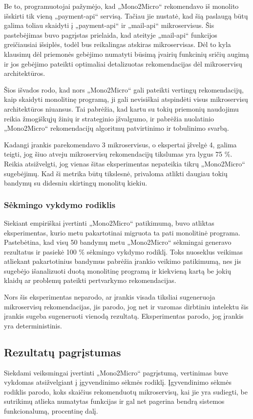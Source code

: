 \documentclass{VUMIFPSbakalaurinis}
\begin{document}
Be to, programuotojai pažymėjo, kad „Mono2Micro“ rekomendavo iš monolito išskirti tik vieną „payment-api“ servisą. Tačiau jie nustatė, kad šią paslaugą būtų galima toliau skaidyti į „payment-api“ ir „mail-api“ mikroservisus. Šis pastebėjimas buvo pagrįstas prielaida, kad ateityje „mail-api“ funkcijos greičiausiai išsiplės, todėl bus reikalingas atskiras mikroservisas. Dėl to kyla klausimų dėl priemonės gebėjimo numatyti būsimą įvairių funkcinių sričių augimą ir jos gebėjimo pateikti optimaliai detalizuotas rekomendacijas dėl mikroservisų architektūros.

Šios išvados rodo, kad nors „Mono2Micro“ gali pateikti vertingų rekomendacijų, kaip skaidyti monolitinę programą, ji gali nevisiškai atspindėti visus mikroservisų architektūros niuansus. Tai pabrėžia, kad kartu su tokių priemonių naudojimu reikia žmogiškųjų žinių ir strateginio įžvalgumo, ir pabrėžia nuolatinio „Mono2Micro“ rekomendacijų algoritmų patvirtinimo ir tobulinimo svarbą.

Kadangi įrankis parekomendavo 3 mikroservisus, o ekspertai įžvelgė 4, galima teigti, jog šiuo atveju mikroservisų rekomendacijų tikslumas yra lygus 75 \%. Reikia atsižvelgti, jog vienas šitas eksperimentas nepateikia tikrų „Mono2Micro“ sugebėjimų. Kad ši metrika būtų tikslesnė, privaloma atlikti daugiau tokių bandymų su didesniu skirtingų monolitų kiekiu.

\subsubsection{Sėkmingo vykdymo rodiklis}
Siekiant empiriškai įvertinti „Mono2Micro“ patikimumą, buvo atliktas eksperimentas, kurio metu pakartotinai migruota ta pati monolitinė programa. Pastebėtina, kad visų 50 bandymų metu „Mono2Micro“ sėkmingai generavo rezultatus ir pasiekė 100 \% sėkmingo vykdymo rodiklį. Toks nuoseklus veikimas atliekant pakartotinius bandymus pabrėžia įrankio veikimo patikimumą, nes jis sugebėjo išanalizuoti duotą monolitinę programą ir kiekvieną kartą be jokių klaidų ar problemų pateikti pertvarkymo rekomendacijas.

Nors šis eksperimentas neparodo, ar įrankis visada tiksliai sugeneruoja mikroservisų rekomendacijas, jis parodo, jog net ir varomas dirbtiniu intelektu šis įrankis sugeba sugeneruoti vienodą rezultatą. Eksperimentas parodo, jog įrankis yra deterministinis.

\subsection{Rezultatų pagrįstumas}
Siekdami veiksmingai įvertinti „Mono2Micro“ pagrįstumą, vertinimas buve vykdomas atsižvelgiant į įgyvendinimo sėkmės rodiklį. Įgyvendinimo sėkmės rodiklis parodo, koks skaičius rekomenduotų mikroservisų, kai jie yra sudiegti, be sutrikimų atlieka numatytas funkcijas ir gal net pagerina bendrą sistemos funkcionalumą, procentinę dalį.
\end{document}
